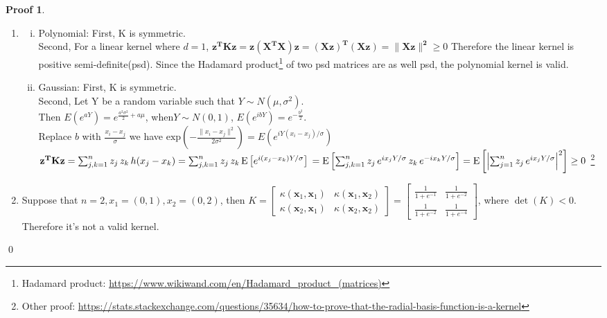\documentclass[a4paper,UTF8]{article}
\numberwithin{equation}{section}
\theoremstyle{definition}
\newtheorem*{prove}{Proof}
\begin{document}
\begin{prove} 

\begin{enumerate}[(1)] 
\item 
	\begin{enumerate}[(i)]
	\item Polynomial:   First, K is symmetric. \\
	 Second, For a linear kernel where $d = 1$, $ \mathbf{z^T K z = z (X^TX)z = (Xz)^T(Xz) = \lVert Xz\rVert^2 } \geq 0 $ Therefore the linear kernel is positive semi-definite(psd). Since the Hadamard product\footnote{Hadamard product: \url{https://www.wikiwand.com/en/Hadamard_product_(matrices)}} of two psd matrices are as well psd, the polynomial kernel is valid.%
\newcommand{\gauss}{\lVert x_i - x_j \rVert ^ 2}
	\item Gaussian: First, K is symmetric. \\
	Second, Let Y be a random variable such that $Y \sim N(\mu, \sigma^2)$.   \\
	Then  $ E(e^{aY})  = e^{\frac{a^2\sigma^2}{2} + a\mu }$,  when$Y \sim N(0, 1)$, $E(e^{ibY}) = e^{-\frac{b^2}{2}}$.\\
	Replace $b $ with $\frac{x_i-x_j}{\sigma}$ we have  $\text{exp}(-\frac{\gauss}{2\sigma^2}) = E(e^{iY(x_i - x_j )/\sigma })$ \\ 
 $\mathbf{z^T K z} =  \sum_{j,k=1}^n z_j\,z_k\,h(x_j-x_k) =
  \sum_{j,k=1}^n z_j\,z_k\,\mathrm{E} \left[ e^{i(x_j-x_k)Y/\sigma}\right]\\
   = \mathrm{E} \left[ \sum_{j,k=1}^n z_j\,e^{i x_j Y/\sigma}\,z_k\,e^{-i x_k Y/\sigma}\right] = \mathrm{E}\left[ \left| \sum_{j=1}^n z_j\,e^{i x_j Y/\sigma}\right|^2\right] \geq 0 $ \footnote{Other proof: \url{https://stats.stackexchange.com/questions/35634/how-to-prove-that-the-radial-basis-function-is-a-kernel}}
	\end{enumerate}
\item  Suppose that $n = 2, x_1 = (0, 1), x_2 = (0, 2)$, then $K = \begin{bmatrix}
   \kappa(\mathbf{x}_1,\mathbf{x}_1)       & \kappa(\mathbf{x}_1,\mathbf{x}_2)   \\
   \kappa(\mathbf{x}_2,\mathbf{x}_1)        & \kappa(\mathbf{x}_2,\mathbf{x}_2) 
\end{bmatrix} = \begin{bmatrix}
   \frac{1}{1+e^{-1}}       & \frac{1}{1+e^{-2}}   \\
   \frac{1}{1+e^{-2}}        & \frac{1}{1+e^{-4}}
\end{bmatrix} $, where $\det(K) < 0$. Therefore it's not a valid kernel.
\end{enumerate}
\qed
\end{prove}
\end{document}
